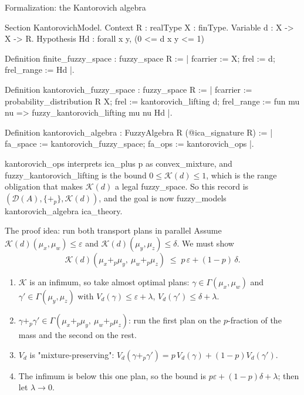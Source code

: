 \documentclass[10pt,aspectratio=169]{beamer}
\newcommand{\Dist}{\mathcal{D}}
\newcommand{\eps}{\varepsilon}
\newcommand{\Kan}{\mathcal{K}}
\newcommand{\Cpl}{\Gamma}
\newcommand{\bpl}[1]{+_{#1}}
\newcommand{\rid}[1]{{\ttfamily\small #1}}
\begin{document}
    \begin{frame}[fragile]{Formalization: the Kantorovich algebra}
        \begin{srcbox}
Section KantorovichModel.
Context {R : realType} {X : finType}.
Variable d : X -> X -> R.
Hypothesis Hd : forall x y, (0 <= d x y <= 1)%

Definition finite_fuzzy_space : fuzzy_space R :=
  {| fcarrier := X; frel := d; frel_range := Hd |}.

Definition kantorovich_fuzzy_space : fuzzy_space R :=
  {| fcarrier := probability_distribution R X;
     frel := kantorovich_lifting d;
     frel_range := fun mu nu => fuzzy_kantorovich_lifting mu nu Hd |}.

Definition kantorovich_algebra : FuzzyAlgebra R (@ica_signature R) :=
  {| fa_space := kantorovich_fuzzy_space; fa_ops := kantorovich_ops |}.
        \end{srcbox}
        \vfill
        \rid{kantorovich\_ops} interprets \rid{ica\_plus p} as
        \rid{convex\_mixture}, and \rid{fuzzy\_kantorovich\_lifting} is the
        bound $0 \leq \Kan(d) \leq 1$, which is the range obligation that
        makes $\Kan(d)$ a legal \rid{fuzzy\_space}. So this record is
        $(\Dist(A),\{\bpl{p}\},\Kan(d))$, and the goal is now
        \rid{fuzzy\_models kantorovich\_algebra ica\_theory}.
    \end{frame}

    \begin{frame}{The proof idea: run both transport plans in parallel}
        Assume $\Kan(d)(\mu_x,\mu_w) \leq \eps$ and
        $\Kan(d)(\mu_y,\mu_z) \leq \delta$. We must show
        \[
            \Kan(d)(\mu_x \bpl{p} \mu_y,\ \mu_w \bpl{p} \mu_z)
            \;\leq\; p\,\eps + (1-p)\,\delta .
        \]
        \pause
        \vfill
        \begin{enumerate}
            \item $\Kan$ is an infimum, so take almost optimal plans:
                $\gamma \in \Cpl(\mu_x,\mu_w)$ and
                $\gamma' \in \Cpl(\mu_y,\mu_z)$ with
                $V_d(\gamma) \leq \eps + \lambda$,
                $V_d(\gamma') \leq \delta + \lambda$.
                \medskip
            \item $\gamma \bpl{p} \gamma' \in
                \Cpl(\mu_x \bpl{p} \mu_y,\ \mu_w \bpl{p} \mu_z)$: run the first
                plan on the $p$-fraction of the mass and the second on the rest.
                \medskip
            \item $V_d$ is "mixture-preserving":
                $V_d(\gamma \bpl{p} \gamma') = p\,V_d(\gamma) +
                (1-p)V_d(\gamma')$.
                \medskip
            \item The infimum is below this one plan, so the bound is
                $p\eps + (1-p)\delta + \lambda$; then let $\lambda \to 0$.
        \end{enumerate}
        \vfill
    \end{frame}
\end{document}
